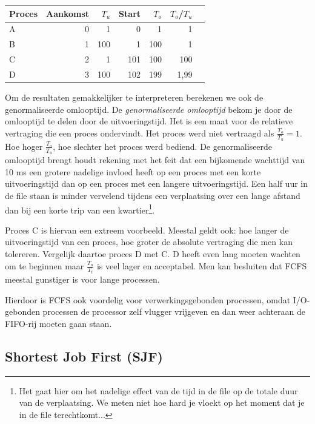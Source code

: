 \begin{center}
\begin{tabular}{|l|r|r|r|r|r|r|}
\hline
Proces & Aankomst & $T_u$ & Start & $T_o$ & ${T_o}$/${T_u}$ \\
\hline
A & 0 &   1 &   0 &   1 &    1 \\
B & 1 & 100 &   1 & 100 &    1 \\
C & 2 &   1 & 101 & 100 &  100 \\
D & 3 & 100 & 102 & 199 & 1,99 \\
\hline
\end{tabular}
\end{center}

Om de resultaten gemakkelijker te interpreteren berekenen we ook de
genormaliseerde omlooptijd. De \emph{genormaliseerde omlooptijd} bekom
je door de omlooptijd te delen door de uitvoeringstijd. Het is een maat
voor de relatieve vertraging die een proces ondervindt. Het proces
werd niet vertraagd als $\frac{T_o}{T_u} = 1$. Hoe hoger $\frac{T_o}{T_u}$, hoe
slechter het proces werd bediend. De genormaliseerde omlooptijd brengt houdt
rekening met het feit dat een bijkomende wachttijd van 10 ms een grotere
nadelige
invloed heeft op een proces met een korte uitvoeringstijd dan op een proces met
een langere uitvoeringstijd. Een half uur in de file staan is minder vervelend
tijdens een verplaatsing over een lange afstand dan bij een korte trip van een
kwartier\footnote{Het gaat hier om het nadelige effect van de tijd in de file
op de totale duur van de verplaatsing. We meten niet hoe hard je vloekt op het
moment dat je in de file terechtkomt...}.

Proces C is hiervan een extreem voorbeeld. Meestal geldt ook: hoe
langer de uitvoeringstijd van een proces, hoe groter de absolute
vertraging die men kan tolereren. Vergelijk daartoe proces D met C. D
heeft even lang moeten wachten om te beginnen maar
$\frac{T_u}{T_t}$ is veel lager en acceptabel. Men kan besluiten dat FCFS
meestal gunstiger is voor lange processen.

Hierdoor is FCFS ook voordelig voor verwerkingsgebonden
processen, omdat I/O-gebonden processen de processor zelf vlugger
vrijgeven en dan weer achteraan de FIFO-rij moeten gaan staan.

\subsection{Shortest Job First (SJF)}\label{sec:sjf}

